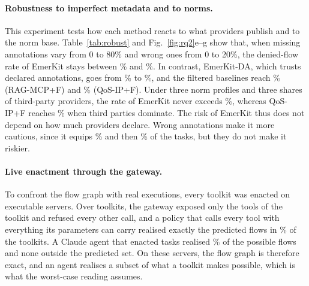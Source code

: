 \documentclass[10pt]{article}
\newcommand{\sysname}{EmerKit}
\begin{document}
\begin{table}[!ht]\centering
\caption{Calibration under distribution shift: calibrated level, test denied-flow rate (\%), and equipped tasks (\%). Underlined rates exceed the target.}\label{tab:shift}
\scriptsize\setlength{\tabcolsep}{6pt}
\end{table}

\begin{table}[!ht]\centering
\caption{Denied-flow rate (\%) under imperfect metadata and under different norm bases. Best value in bold.}\label{tab:robust}
\scriptsize\setlength{\tabcolsep}{4pt}
\end{table}

\paragraph{Robustness to imperfect metadata and to norms.} This experiment tests how each method reacts to what providers publish and to the norm base. Table~\ref{tab:robust} and Fig.~\ref{fig:rq2}e--g show that, when missing annotations vary from 0 to 80\% and wrong ones from 0 to 20\%, the denied-flow rate of \sysname{} stays between \RBtwoEmkMin\% and \RBtwoEmkMax\%. In contrast, \sysname{}-DA, which trusts declared annotations, goes from \RBtwoDeclMzero\% to \RBtwoDeclMeight\%, and the filtered baselines reach \RBtwoRagMax\% (RAG-MCP+F) and \RBtwoZengMax\% (QoS-IP+F). Under three norm profiles and three shares of third-party providers, the rate of \sysname{} never exceeds \RBthreeEmkMax\%, whereas QoS-IP+F reaches \RBthreeZengHigh\% when third parties dominate. The risk of \sysname{} thus does not depend on how much providers declare. Wrong annotations make it more cautious, since it equips \RBtwoEqWzero\% and then \RBtwoEqWtwenty\% of the tasks, but they do not make it riskier.

\paragraph{Live enactment through the gateway.} To confront the flow graph with real executions, every toolkit was enacted on executable servers. Over \RFoneN{} toolkits, the gateway exposed only the tools of the toolkit and refused every other call, and a policy that calls every tool with everything its parameters can carry realised exactly the predicted flows in \RFoneExact\% of the toolkits. A Claude agent that enacted \RFlN{} tasks realised \RFlRealised\% of the possible flows and none outside the predicted set. On these servers, the flow graph is therefore exact, and an agent realises a subset of what a toolkit makes possible, which is what the worst-case reading assumes.
\end{document}
